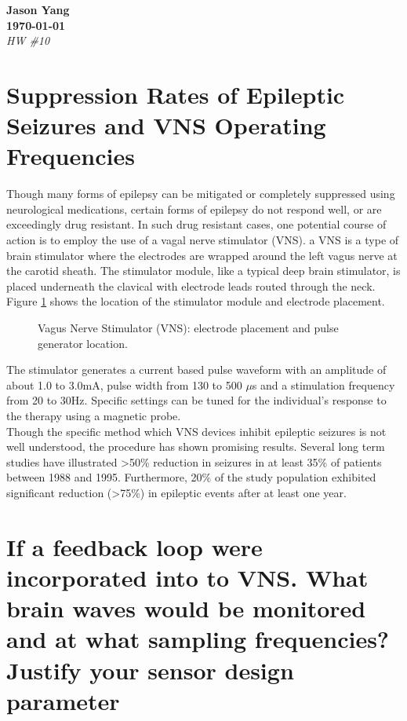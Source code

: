 \documentclass[12pt]{article}
\newcommand{\myName}{Jason Yang}
\begin{document}
	\begin{center}
		\textbf{\large\myName} \\
		\textbf{\today} \\
		\textit{\small HW \#10}
	\end{center}

\section{Suppression Rates of Epileptic Seizures and VNS Operating Frequencies}
	Though many forms of epilepsy can be mitigated or completely suppressed using neurological medications, certain forms of epilepsy do not respond well, or are exceedingly drug resistant. In such drug resistant cases, one potential course of action is to employ the use of a vagal nerve stimulator (VNS). a VNS is a type of brain stimulator where the electrodes are wrapped around the left vagus nerve at the carotid sheath. The stimulator module, like a typical deep brain stimulator, is placed underneath the clavical with electrode leads routed through the neck. Figure \ref{fig:vns} shows the location of the stimulator module and electrode placement. \\
	
	\begin{figure}[htbp]
		\centering
		\caption{Vagus Nerve Stimulator (VNS): electrode placement and pulse generator location.}
		\label{fig:vns}
	\end{figure}
	
	
	The stimulator generates a current based pulse waveform with an amplitude of about 1.0 to 3.0mA, pulse width from 130 to 500 $\mu$s and a stimulation frequency from 20 to 30Hz. Specific settings can be tuned for the individual's response to the therapy using a magnetic probe. \\
	
	Though the specific method which VNS devices inhibit epileptic seizures is not well understood, the procedure has shown promising results. Several long term studies have illustrated >50\% reduction in seizures in at least 35\% of patients between 1988 and 1995. Furthermore, 20\% of the study population exhibited significant reduction (>75\%) in epileptic events after at least one year. 
	
\newpage
\section{If a feedback loop were incorporated into to VNS. What brain waves would be monitored and at what sampling frequencies? Justify your sensor design parameter}
\end{document}
